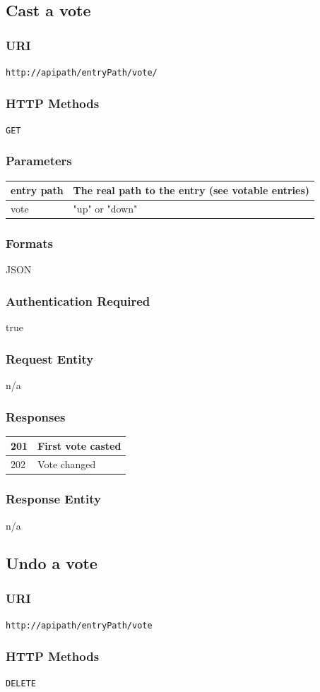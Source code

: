 \documentclass[10pt]{article}
\begin{document}
\subsection{Cast a vote}
\subsubsection{URI}
\texttt{http://apipath/entryPath/vote/
}\subsubsection{HTTP Methods}
\texttt{GET}
\subsubsection{Parameters}
\begin{tabular}{|l|l|}\hline
entry path & The real path to the entry (see votable entries) \\
\hline
vote & "up" or "down" \\
\hline
\end{tabular}
\subsubsection{Formats}
JSON
\subsubsection{Authentication Required}
true
\subsubsection{Request Entity}
n/a
\subsubsection{Responses}
\begin{tabular}{|l|l|}\hline
201 & First vote casted \\
\hline
202 & Vote changed \\
\hline
\end{tabular}
\subsubsection{Response Entity}
n/a
\subsection{Undo a vote}
\subsubsection{URI}
\texttt{http://apipath/entryPath/vote
}\subsubsection{HTTP Methods}
\texttt{DELETE}
\end{document}
